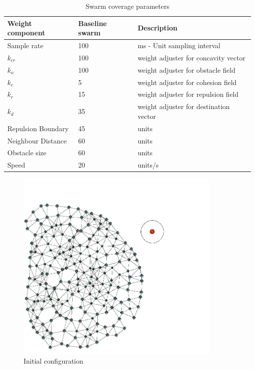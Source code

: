 \begin{table}[H]
\begin{center}
\begin{tabular}{| p{2.3cm} | p{2.3cm} | p{5cm} |}
\hline
\bf Weight \bf component & \bf Baseline \bf swarm & \bf Description \\ \hline
Sample rate & 100 & ms - Unit sampling interval\\  \hline
$k_{cr}$ & 100 & weight adjuster for concavity vector\\  \hline
$k_o$ & 100 & weight adjuster for obstacle field\\  \hline
$k_c$ & 5 & weight adjuster for cohesion field\\  \hline
$k_r$ & 15 & weight adjuster for repulsion  field\\  \hline
$k_d$ & 35 & weight adjuster for destination vector\\  \hline
Repulsion Boundary & 45 & units\\  \hline
Neighbour Distance & 60 & units\\  \hline
Obstacle size & 60 & units\\  \hline
Speed & 20 & units/s\\  \hline
\end{tabular}\caption{Swarm coverage parameters}\label{tab:SwarmCoverageParameters}
\end{center}
\end{table}

\begin{figure}[H]
\begin{center}
\includegraphics[width=10cm]{CHAPTER-7/figures/ObstacleTest}
\end{center}
\caption{Initial configuration\label{voids:ObstacleTest1}}
\end{figure}

